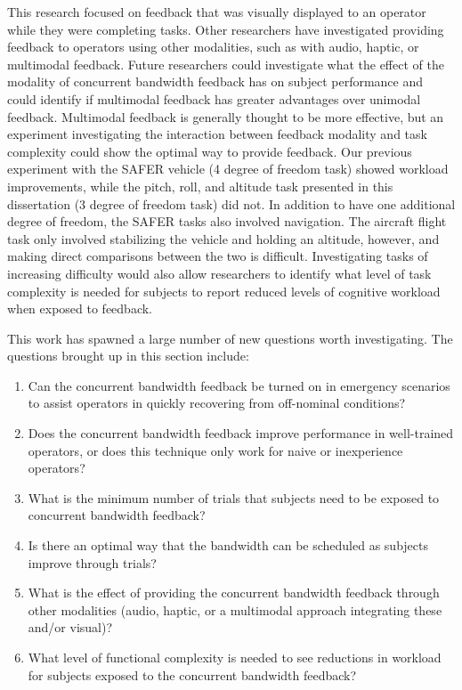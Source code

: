 This research focused on feedback that was visually displayed to an operator while they were completing tasks.
Other researchers have investigated providing feedback to operators using other modalities, such as with audio, haptic, or multimodal feedback.
Future researchers could investigate what the effect of the modality of concurrent bandwidth feedback has on subject performance and could identify if multimodal feedback has greater advantages over unimodal feedback.
Multimodal feedback is generally thought to be more effective, but an experiment investigating the interaction between feedback modality and task complexity could show the optimal way to provide feedback.
Our previous experiment with the SAFER vehicle (4 degree of freedom task) showed workload improvements, while the pitch, roll, and altitude task presented in this dissertation (3 degree of freedom task) did not.
In addition to have one additional degree of freedom, the SAFER tasks also involved navigation.
The aircraft flight task only involved stabilizing the vehicle and holding an altitude, however, and making direct comparisons between the two is difficult.
Investigating tasks of increasing difficulty would also allow researchers to identify what level of task complexity is needed for subjects to report reduced levels of cognitive workload when exposed to feedback.

This work has spawned a large number of new questions worth investigating.
The questions brought up in this section include:
\begin{enumerate}
    \item Can the concurrent bandwidth feedback be turned on in emergency scenarios to assist operators in quickly recovering from off-nominal conditions?
    \item Does the concurrent bandwidth feedback improve performance in well-trained operators, or does this technique only work for naive or inexperience operators?
%
    \item What is the minimum number of trials that subjects need to be exposed to concurrent bandwidth feedback?
    \item Is there an optimal way that the bandwidth can be scheduled as subjects improve through trials?
%
    \item What is the effect of providing the concurrent bandwidth feedback through other modalities (audio, haptic, or a multimodal approach integrating these and/or visual)?
%
    \item What level of functional complexity is needed to see reductions in workload for subjects exposed to the concurrent bandwidth feedback?
\end{enumerate}
